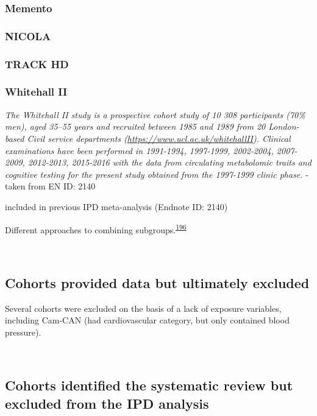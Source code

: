 \documentclass[a4paper, twoside]{templates/ociamthesis}
\begin{document}
\hypertarget{memento}{%
\subsubsection{Memento}\label{memento}}

\hypertarget{nicola}{%
\subsubsection{NICOLA}\label{nicola}}

\hypertarget{track-hd}{%
\subsubsection{TRACK HD}\label{track-hd}}

\hypertarget{whitehall-ii}{%
\subsubsection{Whitehall II}\label{whitehall-ii}}

\emph{The Whitehall II study is a prospective cohort study of 10 308 participants (70\% men), aged 35--55 years and recruited between 1985 and 1989 from 20 London-based Civil service departments (\url{https://www.ucl.ac.uk/whitehallII}). Clinical examinations have been performed in 1991-1994, 1997-1999, 2002-2004, 2007-2009, 2012-2013, 2015-2016 with the data from circulating metabolomic traits and cognitive testing for the present study obtained from the 1997-1999 clinic phase.} - taken from EN ID: 2140

included in previous IPD meta-analysis (Endnote ID: 2140)

Different approaches to combining subgroups.\textsuperscript{\protect\hyperlink{ref-fisher2017}{196}}

~

\hypertarget{cohorts-provided-data-but-ultimately-excluded}{%
\subsection{Cohorts provided data but ultimately excluded}\label{cohorts-provided-data-but-ultimately-excluded}}

Several cohorts were excluded on the basis of a lack of exposure variables, including Cam-CAN (had cardiovascular category, but only contained blood pressure).

~

\hypertarget{cohorts-identified-the-systematic-review-but-excluded-from-the-ipd-analysis}{%
\subsection{Cohorts identified the systematic review but excluded from the IPD analysis}\label{cohorts-identified-the-systematic-review-but-excluded-from-the-ipd-analysis}}
\end{document}
